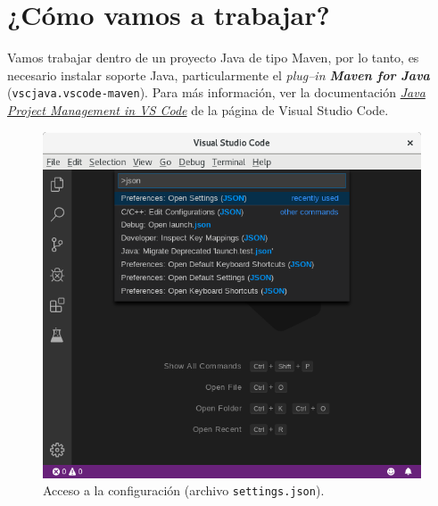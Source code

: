 \documentclass[a5paper,10pt]{article}
\begin{document}
\begin{center}
\end{center}


\section{¿Cómo vamos a trabajar?}

Vamos trabajar dentro de un proyecto Java de tipo Maven, por lo tanto, es necesario instalar soporte Java, particularmente el \emph{plug--in \textbf{Maven for Java}} (\verb|vscjava.vscode-maven|).  Para más información, ver la documentación \href{https://code.visualstudio.com/docs/java/java-project}{\emph{Java Project Management in VS Code}} de la página de Visual Studio Code.

\begin{figure}[p]
	\centering
	\includegraphics[width=.95\textwidth]{img/SelectJSON}
	\caption{Acceso a la configuración (archivo \texttt{settings.json}).}
	\label{preferences}
\end{figure}
\end{document}
